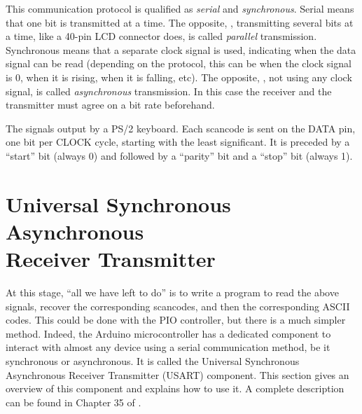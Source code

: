 This communication protocol is qualified as {\em serial} and {\em synchronous}.
Serial means that one bit is transmitted at a time. The opposite, \ie,
transmitting several bits at a time, like a 40-pin LCD connector does, is
called {\em parallel} transmission. Synchronous means that a separate clock
signal is used, indicating when the data signal can be read (depending on the
protocol, this can be when the clock signal is 0, when it is rising, when it is
falling, etc). The opposite, \ie, not using any clock signal, is called {\em
asynchronous} transmission. In this case the receiver and the transmitter must
agree on a bit rate beforehand.

\begin{Figure}
  

  \caption{The signals output by a PS/2 keyboard. Each scancode is sent on the
  DATA pin, one bit per CLOCK cycle, starting with the least significant. It is
  preceded by a ``start'' bit (always 0) and followed by a ``parity'' bit and a
  ``stop'' bit (always 1).}\label{fig:ps2-signals}
\end{Figure}

\section[Universal Synchronous Asynchronous Receiver Transmitter]
        {Universal Synchronous Asynchronous\\
         Receiver Transmitter}\label{section:usart}

At this stage, ``all we have left to do'' is to write a program to read the
above signals, recover the corresponding scancodes, and then the corresponding
ASCII codes. This could be done with the PIO controller, but there is a much
simpler method. Indeed, the Arduino microcontroller has a dedicated component
to interact with almost any device using a serial communication method, be it
synchronous or asynchronous. It is called the Universal Synchronous
Asynchronous Receiver Transmitter (USART) component. This section gives an
overview of this component and explains how to use it. A complete description
can be found in Chapter 35 of \cite{SAM3X8E}.

